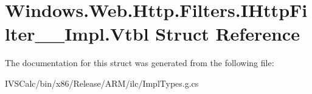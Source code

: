 \hypertarget{struct_windows_1_1_web_1_1_http_1_1_filters_1_1_i_http_filter_____impl_1_1_vtbl}{}\section{Windows.\+Web.\+Http.\+Filters.\+I\+Http\+Filter\+\_\+\+\_\+\+Impl.\+Vtbl Struct Reference}
\label{struct_windows_1_1_web_1_1_http_1_1_filters_1_1_i_http_filter_____impl_1_1_vtbl}


The documentation for this struct was generated from the following file\+:\begin{DoxyCompactItemize}
\item 
I\+V\+S\+Calc/bin/x86/\+Release/\+A\+R\+M/ilc/Impl\+Types.\+g.\+cs\end{DoxyCompactItemize}
